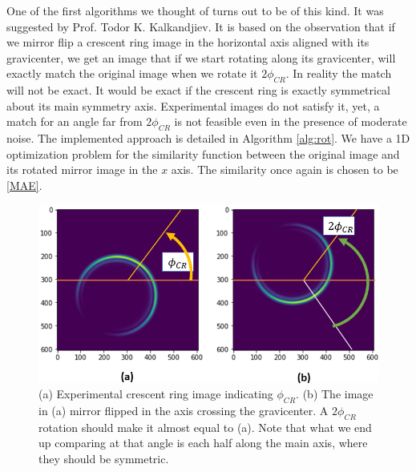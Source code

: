 \documentclass[11pt, a4paper, twoside]{article} %
\begin{document}
One of the first algorithms we thought of turns out to be of this kind. It was suggested by Prof. Todor K. Kalkandjiev. It is based on the observation that if we mirror flip a crescent ring image in the horizontal axis aligned with its gravicenter, we get an image that if we start rotating along its gravicenter, will exactly match the original image when we rotate it $2\phi_{CR}$. In reality the match will not be exact. It would be exact if the crescent ring is exactly symmetrical about its main symmetry axis. Experimental images do not satisfy it, yet, a match for an angle far from $2\phi_{CR}$ is not feasible even in the presence of moderate noise. The implemented approach is detailed in Algorithm \ref{alg:rot}. We have a 1D optimization problem for the similarity function between the original image and its rotated mirror image in the $x$ axis. The similarity once again is chosen to be \eqref{MAE}.

\begin{figure}[h!] 
     \centering 
    \includegraphics[width=0.65\linewidth]{rot.PNG}
    \caption{(a) Experimental crescent ring image indicating $\phi_{CR}$. (b) The image in (a) mirror flipped in the axis crossing the gravicenter. A $2\phi_{CR}$ rotation should make it almost equal to (a). Note that what we end up comparing at that angle is each half along the main axis, where they should be symmetric. }
    \label{fig:kalk}
\end{figure}
\end{document}
